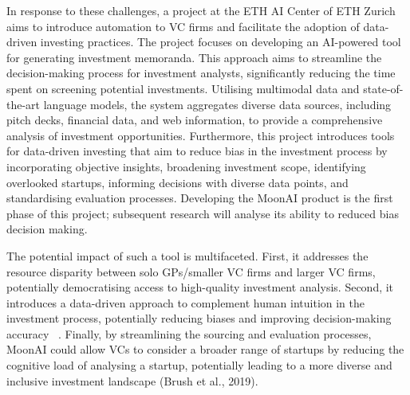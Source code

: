 \documentclass[a4paper, oneside]{discothesis}
\begin{document}
In response to these challenges, a project at the ETH AI Center of ETH Zurich aims to introduce automation to VC firms and facilitate the adoption of data-driven investing practices. 
The project focuses on developing an AI-powered tool for generating investment memoranda. This approach aims to streamline the decision-making process for investment analysts, significantly reducing the time spent on screening potential investments. 
Utilising multimodal data and state-of-the-art language models, the system aggregates diverse data sources, including pitch decks, financial data, and web information, to provide a comprehensive analysis of investment opportunities.
Furthermore, this project introduces tools for data-driven investing that aim to reduce bias in the investment process by incorporating objective insights, broadening investment scope, identifying overlooked startups, informing decisions with diverse data points, and standardising evaluation processes. Developing the MoonAI product is the first phase of this project; subsequent research will analyse its ability to reduced bias decision making. 

The potential impact of such a tool is multifaceted. First, it addresses the resource disparity
between solo GPs/smaller VC firms and larger VC firms, potentially democratising access to high-quality investment
analysis. Second, it introduces a data-driven approach to complement human intuition in the
investment process, potentially reducing biases and improving decision-making accuracy
~\cite{dellermann}. Finally, by streamlining the sourcing and evaluation processes, MoonAI
could allow VCs to consider a broader range of startups by reducing the cognitive load of analysing a startup, potentially leading to a more diverse
and inclusive investment landscape (Brush et al., 2019).
\end{document}
